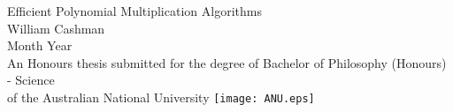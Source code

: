 \begin{titlepage}
\begin{center}

\vspace*{\fill} \Huge
Efficient Polynomial Multiplication Algorithms                        
\\
\vfill\vfill\Large
William Cashman
\\
\vfill\vfill
                          Month Year
\\
\vfill\vfill \normalsize
An Honours thesis submitted for the degree of Bachelor of Philosophy (Honours) - Science\\
         of the Australian National University
\vfill
         \texttt{[image: ANU.eps]}

\end{center}

\end{titlepage}
